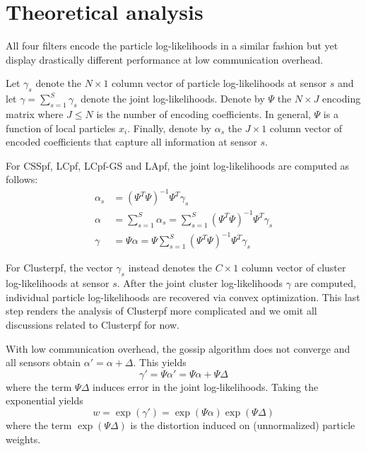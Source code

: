 \documentclass[10pt,letterpaper,final]{article}
\begin{document}
\section{Theoretical analysis}
All four filters encode the particle log-likelihoods in a similar fashion but yet display drastically different performance at low communication overhead. 

Let $\gamma_s$ denote the $N\times 1$ column vector of particle log-likelihoods at sensor $s$ and let $\gamma = \sum_{s=1}^S \gamma_s$ denote the joint log-likelihoods. Denote by $\Psi$ the $N\times J$ encoding matrix where $J \leq N$ is the number of encoding coefficients. In general, $\Psi$ is a function of local particles $x_i$. Finally, denote by $\alpha_s$ the $J\times 1$ column vector of encoded coefficients that capture all information at sensor $s$. 

For CSSpf, LCpf, LCpf-GS and LApf, the joint log-likelihoods are computed as follows:
\begin{align}
\alpha_s &= (\Psi^T \Psi)^{-1}\Psi^T \gamma_s\\
\alpha &= \sum_{s=1}^S \alpha_s = \sum_{s=1}^S (\Psi^T \Psi)^{-1}\Psi^T \gamma_s \\
\gamma &= \Psi \alpha = \Psi \sum_{s=1}^S (\Psi^T \Psi)^{-1}\Psi^T \gamma_s
\end{align}

For Clusterpf, the vector $\gamma_s$ instead denotes the $C\times 1$ column vector of cluster log-likelihoods at sensor $s$. After the joint cluster log-likelihoods $\gamma$ are computed, individual particle log-likelihoods are recovered via convex optimization. This last step renders the analysis of Clusterpf more complicated and we omit all discussions related to Clusterpf for now. 

With low communication overhead, the gossip algorithm does not converge and all sensors obtain $\alpha' = \alpha + \Delta$. This yields
\begin{equation}
\gamma' = \Psi \alpha' = \Psi \alpha + \Psi \Delta
\end{equation}
where the term $\Psi \Delta$ induces error in the joint log-likelihoods. Taking the exponential yields
\begin{equation}
w = \exp(\gamma') = \exp(\Psi\alpha)\exp(\Psi\Delta)
\end{equation}
where the term $\exp(\Psi\Delta)$ is the distortion induced on (unnormalized) particle weights. 
\end{document}
